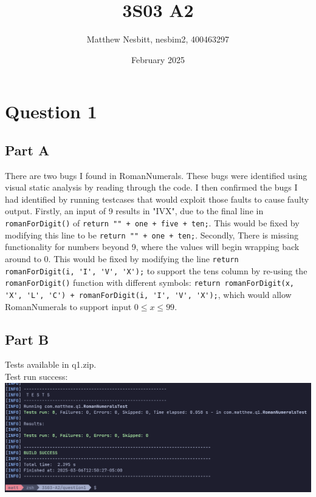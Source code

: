 \documentclass{article}
\title{3S03 A2}
\author{Matthew Nesbitt, nesbim2, 400463297}
\date{February 2025}
\begin{document}
\maketitle
\section{Question 1}
\subsection{Part A}
There are two bugs I found in RomanNumerals. These bugs were identified using visual static analysis by reading through the code. I then
confirmed the bugs I had identified by running testcases that would exploit those faults to cause faulty output.
Firstly, an input of 9 results in "IVX", due to the final line in \lstinline{romanForDigit()} of
\lstinline{return "" + one + five + ten;}. This would be fixed by modifying this line to be \lstinline{return "" + one + ten;}. Secondly, There
is missing functionality for numbers beyond 9, where the values will begin wrapping back around to 0. This would be fixed by modifying the
line \lstinline{return romanForDigit(i, 'I', 'V', 'X');} to support the tens column by re-using the \lstinline{romanForDigit()} function
with different symbols: \lstinline{return romanForDigit(x, 'X', 'L', 'C') + romanForDigit(i, 'I', 'V', 'X');},
which would allow RomanNumerals to support input $0 \leq x \leq 99$.
\subsection{Part B}
Tests available in q1.zip.\\
Test run success:\medskip \\
\includegraphics[scale=0.3]{tests.png}
\end{document}
